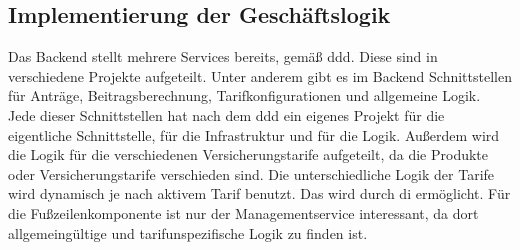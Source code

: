 \subsection{Implementierung der Geschäftslogik}
\label{geschaeftslogikimplementieren}
Das Backend stellt mehrere Services bereits, gemäß \gls{ddd}. Diese sind in verschiedene Projekte aufgeteilt. Unter anderem gibt es im Backend Schnittstellen für Anträge, Beitragsberechnung, Tarifkonfigurationen und allgemeine Logik. Jede dieser Schnittstellen hat nach dem \gls{ddd} ein eigenes Projekt für die eigentliche Schnittstelle, für die Infrastruktur und für die Logik. Außerdem wird die Logik für die verschiedenen Versicherungstarife aufgeteilt, da die Produkte oder Versicherungstarife verschieden sind. Die unterschiedliche Logik der Tarife wird dynamisch je nach aktivem Tarif benutzt. Das wird durch \gls{di} ermöglicht. Für die Fußzeilenkomponente ist nur der Managementservice interessant, da dort allgemeingültige und tarifunspezifische Logik zu finden ist.\\

